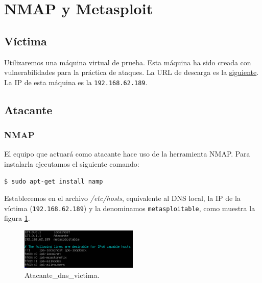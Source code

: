 \documentclass[a4,12pt,onecolum]{article}
\begin{document}

%




\clearpage
\section{NMAP y Metasploit}

\subsection{Víctima}
Utilizaremos una máquina virtual de prueba. Esta máquina ha sido creada con vulnerabilidades para la práctica de ataques. La URL de descarga es la \href{wiki.inf.um.es/metasploitable2/metasploitable-linux-2.0.0.zip}{siguiente}. \\

La IP de esta máquina es la \texttt{192.168.62.189}.

\subsection{Atacante}

\subsubsection{NMAP}

El equipo que actuará como atacante hace uso de la herramienta NMAP. Para instalarla ejecutamos el siguiente comando:

\begin{verbatim}
$ sudo apt-get install namp
\end{verbatim}

Establecemos en el archivo \emph{/etc/hosts}, equivalente al DNS local, la IP de la víctima (\texttt{192.168.62.189}) y la denominamos \texttt{metasploitable}, como muestra la figura \ref{fig:nmap1}. \\

\begin{figure}[htbp]
\centering
\includegraphics[width=0.5\textwidth]{./images/Atacante_dns_victima.png}
\caption{Atacante\_dns\_victima.}
\label{fig:nmap1}
\end{figure}
\end{document}
